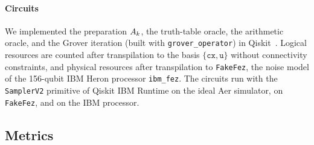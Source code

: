 \paragraph{Circuits} We implemented the preparation $A_k$, the truth-table oracle, the arithmetic oracle, and the Grover iteration (built with \texttt{grover\_operator}) in Qiskit~\cite{qiskit2024}. Logical resources are counted after transpilation to the basis $\{\texttt{cx},\texttt{u}\}$ without connectivity constraints, and physical resources after transpilation to \texttt{FakeFez}, the noise model of the 156-qubit IBM Heron processor \texttt{ibm\_fez}. The circuits run with the \texttt{SamplerV2} primitive of Qiskit IBM Runtime on the ideal Aer simulator, on \texttt{FakeFez}, and on the IBM processor.

\subsection{Metrics}\label{sec:method-metrics}
